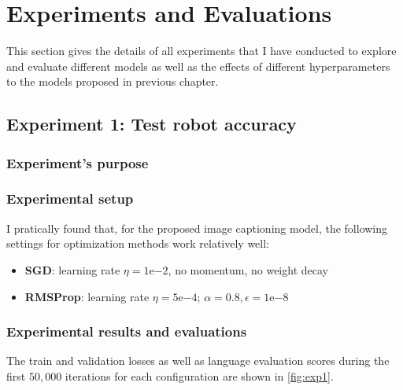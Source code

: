 \section{Experiments and Evaluations}
\label{sec:chap4_experiment}

This section gives the details of all experiments that I have conducted to explore and evaluate different models as well as the effects of different hyperparameters to the models proposed in previous chapter. 


\subsection{Experiment 1: Test robot accuracy}
\subsubsection{Experiment's purpose}

\subsubsection{Experimental setup}
I pratically found that, for the proposed image captioning model, the following settings for optimization methods work relatively well:
	\begin{itemize}
		\item \textbf{SGD}: learning rate $\eta = 1\mathrm{e}{-2}$, no momentum, no weight decay
		\item \textbf{RMSProp}: learning rate $\eta = 5\mathrm{e}{-4}$; $\alpha = 0.8, \epsilon = 1\mathrm{e}{-8}$
	\end{itemize}

\subsubsection{Experimental results and evaluations}

The train and validation losses as well as language evaluation scores during the first $50,000$ iterations for each configuration are shown in \ref{fig:exp1}. 


